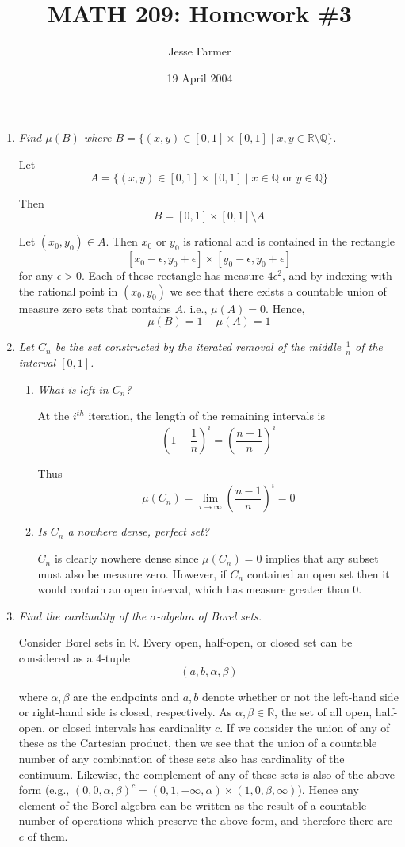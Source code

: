 \documentclass[11pt]{article}
\title{MATH 209: Homework \#3}
\author{Jesse Farmer}
\date{19 April 2004}
\newcommand{\R}{\mathbb{R}}
\newcommand{\Q}{\mathbb{Q}}
\begin{document}
\maketitle
\begin{enumerate}
\item \emph{Find $\mu(B)$ where $B = \{(x,y) \in [0,1] \times [0,1] \mid x,y \in \R \setminus \Q\}$.}

Let
\[
A = \{(x,y) \in [0,1] \times [0,1] \mid x \in \Q \mbox{ or } y \in \Q\}
\]

Then
\[
B = [0,1] \times [0,1] \setminus A
\]

Let $(x_0,y_0) \in A$.  Then $x_0$ or $y_0$ is rational and is contained in the rectangle 
\[
[x_0 - \epsilon, y_0 + \epsilon] \times [y_0 - \epsilon, y_0+\epsilon]
\]
for any $\epsilon > 0$.  Each of these rectangle has measure $4\epsilon^2$, and by indexing with the rational point in $(x_0, y_0)$ we see that there exists a countable union of measure zero sets that contains $A$, i.e., $\mu(A) = 0$.  Hence,
\[
\mu(B) = 1 - \mu(A) = 1
\]

\item \emph{Let $C_n$ be the set constructed by the iterated removal of the middle $\frac{1}{n}$ of the interval $[0,1]$.}
\begin{enumerate}
\item \emph{What is left in $C_n$?}

At the $i^{th}$ iteration, the length of the remaining intervals is
\[
\left(1-\frac{1}{n}\right)^i = \left(\frac{n-1}{n}\right)^i
\]

Thus
\[
\mu(C_n) = \lim_{i \rightarrow \infty} \left(\frac{n-1}{n}\right)^i = 0
\]
\item \emph{Is $C_n$ a nowhere dense, perfect set?}

$C_n$ is clearly nowhere dense since $\mu(C_n) = 0$ implies that any subset must also be measure zero.  However, if $C_n$ contained an open set then it would contain an open interval, which has measure greater than $0$.
\end{enumerate}

\item \emph{Find the cardinality of the $\sigma$-algebra of Borel sets.}

Consider Borel sets in $\R$.  Every open, half-open, or closed set can be considered as a $4$-tuple
\[
(a,b,\alpha,\beta)
\]

where $\alpha, \beta$ are the endpoints and $a,b$ denote whether or not the left-hand side or right-hand side is closed, respectively.  As $\alpha, \beta \in \R$, the set of all open, half-open, or closed intervals has cardinality $c$.  If we consider the union of any of these as the Cartesian product, then we see that the union of a countable number of any combination of these sets also has cardinality of the continuum.  Likewise, the complement of any of these sets is also of the above form (e.g., $(0,0,\alpha,\beta)^c = (0,1,-\infty,\alpha) \times (1,0,\beta,\infty)$).  Hence any element of the Borel algebra can be written as the result of a countable number of operations which preserve the above form, and therefore there are $c$ of them.


\end{enumerate}
\end{document}
